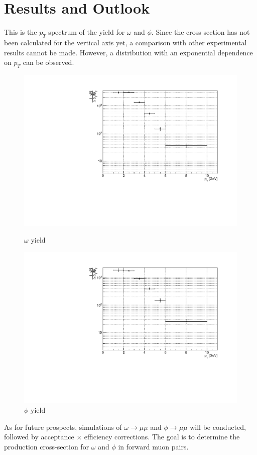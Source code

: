 \newpage
\clearpage
\section{Results and Outlook}
    This is the $p_T$ spectrum of the yield for $\omega$ and $\phi$. Since the cross section has not been calculated for the vertical axis yet, a comparison with other experimental results cannot be made. However, a distribution with an exponential dependence on $p_T$ can be observed.
    \begin{figure}[htbp]
        \centering
        \begin{minipage}{0.45\textwidth} %
            \centering
            \includegraphics[width=\textwidth]{fig/4_omega_yield.pdf} %
            \caption{$\omega$ yield}
            \label{fig:omega_yield}
        \end{minipage}
        \hfill
        \begin{minipage}{0.45\textwidth}
            \centering
            \includegraphics[width=\textwidth]{fig/4_phi_yield.pdf} %
            \caption{$\phi$ yield}
            \label{fig:phi_yield}
        \end{minipage}
    \end{figure}
    As for future prospects, simulations of $\omega \rightarrow \mu\mu$ and $\phi \rightarrow \mu\mu$ will be conducted, followed by acceptance $\times$ efficiency corrections. The goal is to determine the production cross-section for $\omega$ and $\phi$ in forward muon pairs.
